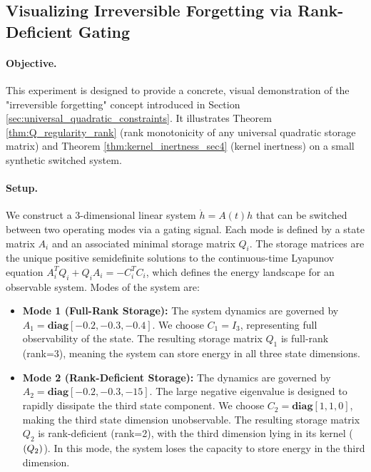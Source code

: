 \documentclass[10pt]{article} %
\let\ker\relax\DeclareMathOperator{\ker}{Ker}           %
\theoremstyle{definition}
\begin{document}
\subsection{Visualizing Irreversible Forgetting via Rank-Deficient Gating}
\label{subsec:sim_forgetting}

\paragraph{Objective.}
This experiment is designed to provide a concrete, visual demonstration of the "irreversible forgetting" concept introduced in Section \ref{sec:universal_quadratic_constraints}. It illustrates Theorem \ref{thm:Q_regularity_rank} (rank monotonicity of any universal quadratic storage matrix) and Theorem \ref{thm:kernel_inertness_sec4} (kernel inertness) on a small synthetic switched system.

\paragraph{Setup.}
We construct a 3-dimensional linear system $\dot{h} = A(t)h$ that can be switched between two operating modes via a gating signal. Each mode is defined by a state matrix $A_i$ and an associated minimal storage matrix $Q_i$. The storage matrices are the unique positive semidefinite solutions to the continuous-time Lyapunov equation $A_i^T Q_i + Q_i A_i = -C_i^T C_i$, which defines the energy landscape for an observable system. Modes of the system are:
\begin{itemize}
    \item \textbf{Mode 1 (Full-Rank Storage):} The system dynamics are governed by $A_1 = \mathbf{diag}[-0.2, -0.3, -0.4]$. We choose $C_1 = I_3$, representing full observability of the state. The resulting storage matrix $Q_1$ is full-rank (rank=3), meaning the system can store energy in all three state dimensions.

    \item \textbf{Mode 2 (Rank-Deficient Storage):} The dynamics are governed by $A_2 = \mathbf{diag}[-0.2, -0.3, -15]$. The large negative eigenvalue is designed to rapidly dissipate the third state component. We choose $C_2 = \mathbf{diag}[1, 1, 0]$, making the third state dimension unobservable. The resulting storage matrix $Q_2$ is rank-deficient (rank=2), with the third dimension lying in its kernel ($\ker(Q_2)$). In this mode, the system loses the capacity to store energy in the third dimension.
\end{itemize}
\end{document}
